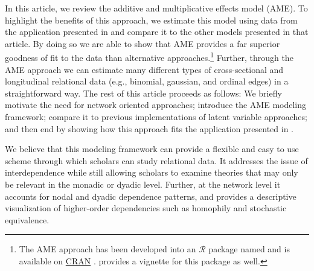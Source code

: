 In this article, we review the additive and multiplicative effects model (AME). To highlight the benefits of this approach, we estimate this model using data from  the application presented in \citet{cranmer:etal:2016} and compare it to the other models presented in that article. By doing so we are able to show that AME provides a far superior goodness of fit to the data than alternative approaches.\footnote{The AME approach has been developed into an $\mathcal{R}$ package named  and is available on \href{https://cran.r-project.org/web/packages/amen/index.html}{CRAN} \citep{hoff:etal:2015}. \citet{hoff:2015:arxiv} provides a vignette for this package as well.} Further, through the AME approach we can estimate many different types of cross-sectional and longitudinal relational data (e.g., binomial, gaussian, and ordinal edges) in a straightforward way. The rest of this article proceeds as follows: We briefly motivate the need for network oriented approaches; introduce the AME modeling framework; compare it to previous implementations of latent variable approaches; and then end by showing how this approach fits the application presented in \citet{cranmer:etal:2016}. 

We believe that this modeling framework can provide a flexible and easy to use scheme through which scholars can study relational data. It addresses the issue of interdependence while still allowing scholars to examine theories that may only be relevant in the monadic or dyadic level. Further, at the network level it accounts for nodal and dyadic dependence patterns, and provides a descriptive visualization of higher-order dependencies such as homophily and stochastic equivalence. 

